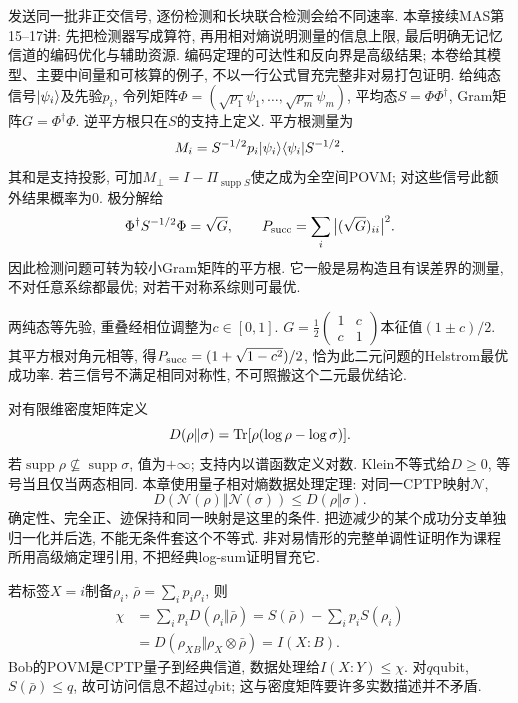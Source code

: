 发送同一批非正交信号, 逐份检测和长块联合检测会给不同速率. 本章接续MAS第15--17讲: 先把检测器写成算符, 再用相对熵说明测量的信息上限, 最后明确无记忆信道的编码优化与辅助资源. 编码定理的可达性和反向界是高级结果; 本卷给其模型、主要中间量和可核算的例子, 不以一行公式冒充完整非对易打包证明.
给纯态信号$\lvert \psi_i\rangle$及先验$p_i$, 令列矩阵$\Phi=(\sqrt{p_1}\psi_1,\ldots,\sqrt{p_m}\psi_m)$, 平均态$S=\Phi\Phi^\dagger$, Gram矩阵$G=\Phi^\dagger\Phi$. 逆平方根只在$S$的支持上定义. 平方根测量为
\[M_i=S^{-1/2}p_i\lvert \psi_i\rangle\langle \psi_i\rvert S^{-1/2}.\]
其和是支持投影, 可加$M_\perp=I-\Pi_{\operatorname{supp}S}$使之成为全空间POVM; 对这些信号此额外结果概率为0. 极分解给
\[\Phi^\dagger S^{-1/2}\Phi=\sqrt G,\qquad
 P_{\rm succ}=\sum_i\big|(\sqrt G)_{ii}\big|^2.\]
因此检测问题可转为较小Gram矩阵的平方根. 它一般是易构造且有误差界的测量, 不对任意系综都最优; 对若干对称系综则可最优.

\begin{example}两纯态等先验, 重叠经相位调整为$c\in[0,1]$. $G=\frac12\left(\begin{smallmatrix}1&c\\c&1\end{smallmatrix}\right)$本征值$(1\pm c)/2$. 其平方根对角元相等, 得$P_{\rm succ}=(1+\sqrt{1-c^2})/2$, 恰为此二元问题的Helstrom最优成功率. 若三信号不满足相同对称性, 不可照搬这个二元最优结论.\end{example}

对有限维密度矩阵定义
\[D(\rho\Vert\sigma)=\operatorname{Tr}[\rho(\log\rho-\log\sigma)].\]
若$\operatorname{supp}\rho\not\subseteq\operatorname{supp}\sigma$, 值为$+\infty$; 支持内以谱函数定义对数. Klein不等式给$D\ge0$, 等号当且仅当两态相同. 本章使用量子相对熵数据处理定理: 对同一CPTP映射$\mathcal N$,
\[D(\mathcal N(\rho)\Vert\mathcal N(\sigma))\le D(\rho\Vert\sigma).\]
确定性、完全正、迹保持和同一映射是这里的条件. 把迹减少的某个成功分支单独归一化并后选, 不能无条件套这个不等式. 非对易情形的完整单调性证明作为课程所用高级熵定理引用, 不把经典log-sum证明冒充它.

若标签$X=i$制备$\rho_i$, $\bar\rho=\sum_ip_i\rho_i$, 则
\begin{align*}
 \chi&=\sum_ip_iD(\rho_i\Vert\bar\rho)
 =S(\bar\rho)-\sum_ip_iS(\rho_i)\\
 &=D(\rho_{XB}\Vert\rho_X\otimes\bar\rho)
 =I(X:B).
\end{align*}
Bob的POVM是CPTP量子到经典信道, 数据处理给$I(X:Y)\le\chi$. 对$q$qubit, $S(\bar\rho)\le q$, 故可访问信息不超过$q$bit; 这与密度矩阵要许多实数描述并不矛盾.

